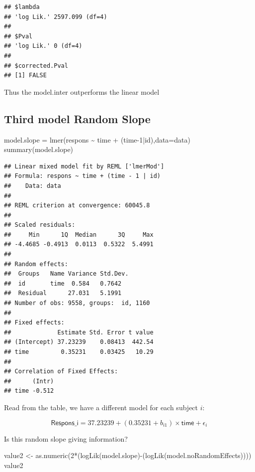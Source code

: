 \documentclass[
]{article}
\newenvironment{Shaded}{\begin{snugshade}}{\end{snugshade}}
\newcommand{\AttributeTok}[1]{\textcolor[rgb]{0.77,0.63,0.00}{#1}}
\newcommand{\DecValTok}[1]{\textcolor[rgb]{0.00,0.00,0.81}{#1}}
\newcommand{\FunctionTok}[1]{\textcolor[rgb]{0.00,0.00,0.00}{#1}}
\newcommand{\NormalTok}[1]{#1}
\newcommand{\OtherTok}[1]{\textcolor[rgb]{0.56,0.35,0.01}{#1}}
\newcommand{\SpecialCharTok}[1]{\textcolor[rgb]{0.00,0.00,0.00}{#1}}
\begin{document}
\begin{verbatim}
## $lambda
## 'log Lik.' 2597.099 (df=4)
## 
## $Pval
## 'log Lik.' 0 (df=4)
## 
## $corrected.Pval
## [1] FALSE
\end{verbatim}

Thus the model.inter outperforms the linear model

\hypertarget{third-model-random-slope}{%
\subsection{Third model Random Slope}\label{third-model-random-slope}}

\begin{Shaded}
\begin{Highlighting}[]
\NormalTok{model.slope }\OtherTok{=} \FunctionTok{lmer}\NormalTok{(respons }\SpecialCharTok{\textasciitilde{}}\NormalTok{ time }\SpecialCharTok{+}\NormalTok{ (time}\DecValTok{{-}1}\SpecialCharTok{|}\NormalTok{id),}\AttributeTok{data=}\NormalTok{data)}
\FunctionTok{summary}\NormalTok{(model.slope)}
\end{Highlighting}
\end{Shaded}

\begin{verbatim}
## Linear mixed model fit by REML ['lmerMod']
## Formula: respons ~ time + (time - 1 | id)
##    Data: data
## 
## REML criterion at convergence: 60045.8
## 
## Scaled residuals: 
##     Min      1Q  Median      3Q     Max 
## -4.4685 -0.4913  0.0113  0.5322  5.4991 
## 
## Random effects:
##  Groups   Name Variance Std.Dev.
##  id       time  0.584   0.7642  
##  Residual      27.031   5.1991  
## Number of obs: 9558, groups:  id, 1160
## 
## Fixed effects:
##             Estimate Std. Error t value
## (Intercept) 37.23239    0.08413  442.54
## time         0.35231    0.03425   10.29
## 
## Correlation of Fixed Effects:
##      (Intr)
## time -0.512
\end{verbatim}

Read from the table, we have a different model for each subject \(i\):

\[\textsf{Respons_i} = 37.23239  + (0.35231+b_{i1}) \times \textsf{time}+ \epsilon_i\]

Is this random slope giving information?

\begin{Shaded}
\begin{Highlighting}[]
\NormalTok{value2 }\OtherTok{\textless{}{-}} \FunctionTok{as.numeric}\NormalTok{(}\DecValTok{2}\SpecialCharTok{*}\NormalTok{(}\FunctionTok{logLik}\NormalTok{(model.slope)}\SpecialCharTok{{-}}\NormalTok{(}\FunctionTok{logLik}\NormalTok{(model.noRandomEffects))))}
\NormalTok{value2}
\end{Highlighting}
\end{Shaded}
\end{document}
